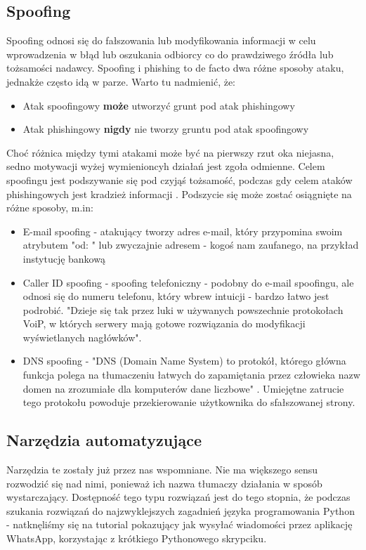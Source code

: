 \documentclass[]{article}
\begin{document}
\subsection{Spoofing}
Spoofing odnosi się do fałszowania lub modyfikowania informacji w celu wprowadzenia w błąd lub oszukania odbiorcy co do prawdziwego źródła lub tożsamości nadawcy. Spoofing i phishing to de facto dwa różne sposoby ataku, jednakże często idą w parze. Warto tu nadmienić, że:
\begin{itemize}[label=$\rightarrow$]
	\item Atak spoofingowy {\bfseries może} utworzyć grunt pod atak phishingowy
	\item Atak phishingowy {\bfseries nigdy} nie tworzy gruntu pod atak spoofingowy
\end{itemize}
Choć różnica między tymi atakami może być na pierwszy rzut oka niejasna, sedno motywacji wyżej wymienioncyh działań jest zgoła odmienne. Celem spoofingu jest podszywanie się pod czyjąś tożsamość, podczas gdy celem ataków phishingowych jest kradzież informacji \cite{crowdstrike_phishing_vs_spoofing}.
Podszycie się może zostać osiągnięte na różne sposoby, m.in:
\begin{itemize}[label=$\rightarrow$]
	\item E-mail spoofing - atakujący tworzy adres e-mail, który przypomina swoim atrybutem "od: " lub zwyczajnie adresem - kogoś nam zaufanego, na przykład instytucję bankową
	\item Caller ID spoofing - spoofing telefoniczny - podobny do e-mail spoofingu, ale odnosi się do numeru telefonu, który wbrew intuicji - bardzo łatwo jest podrobić. "Dzieje się tak przez luki w używanych powszechnie protokołach VoiP, w których serwery mają gotowe rozwiązania do modyfikacji wyświetlanych nagłówków"\cite{netia_spoofing}.
	\item DNS spoofing - "DNS (Domain Name System) to protokół, którego główna funkcja polega na tłumaczeniu łatwych do zapamiętania przez człowieka nazw domen na zrozumiałe dla komputerów dane liczbowe" \cite{netia_dns}. Umiejętne zatrucie tego protokołu powoduje przekierowanie użytkownika do sfałszowanej strony.  
\end{itemize}

\subsection{Narzędzia automatyzujące}
Narzędzia te zostały już przez nas wspomniane. Nie ma większego sensu rozwodzić się nad nimi, ponieważ ich nazwa tłumaczy działania w sposób wystarczający. Dostępność tego typu rozwiązań jest do tego stopnia, że podczas szukania rozwiązań do najzwyklejszych zagadnień języka programowania Python - natknęliśmy się na tutorial pokazujący jak wysyłać wiadomości przez aplikację WhatsApp, korzystając z krótkiego Pythonowego skrypciku. 
\end{document}
